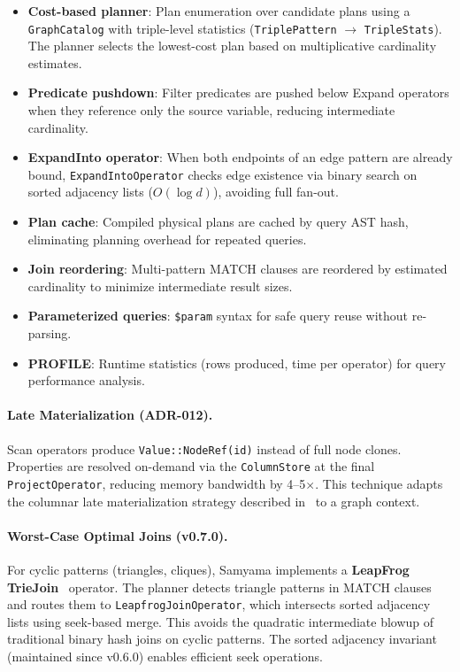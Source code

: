 \documentclass[11pt]{article}
\begin{document}
\begin{itemize}[leftmargin=*]
  \item \textbf{Cost-based planner}: Plan enumeration over candidate plans using a \texttt{GraphCatalog} with triple-level statistics (\texttt{TriplePattern} $\to$ \texttt{TripleStats}). The planner selects the lowest-cost plan based on multiplicative cardinality estimates.
  \item \textbf{Predicate pushdown}: Filter predicates are pushed below Expand operators when they reference only the source variable, reducing intermediate cardinality.
  \item \textbf{ExpandInto operator}: When both endpoints of an edge pattern are already bound, \texttt{ExpandIntoOperator} checks edge existence via binary search on sorted adjacency lists ($O(\log d)$), avoiding full fan-out.
  \item \textbf{Plan cache}: Compiled physical plans are cached by query AST hash, eliminating planning overhead for repeated queries.
  \item \textbf{Join reordering}: Multi-pattern MATCH clauses are reordered by estimated cardinality to minimize intermediate result sizes.
  \item \textbf{Parameterized queries}: \texttt{\$param} syntax for safe query reuse without re-parsing.
  \item \textbf{PROFILE}: Runtime statistics (rows produced, time per operator) for query performance analysis.
\end{itemize}

\paragraph{Late Materialization (ADR-012).}
Scan operators produce \texttt{Value::NodeRef(id)} instead of full node clones. Properties are resolved on-demand via the \texttt{ColumnStore} at the final \texttt{ProjectOperator}, reducing memory bandwidth by 4--5$\times$. This technique adapts the columnar late materialization strategy described in~\citet{abadi2008column} to a graph context.

\paragraph{Worst-Case Optimal Joins (v0.7.0).}
For cyclic patterns (triangles, cliques), Samyama implements a \textbf{LeapFrog TrieJoin}~\citep{veldhuizen2014triejoin} operator. The planner detects triangle patterns in MATCH clauses and routes them to \texttt{LeapfrogJoinOperator}, which intersects sorted adjacency lists using seek-based merge. This avoids the quadratic intermediate blowup of traditional binary hash joins on cyclic patterns. The sorted adjacency invariant (maintained since v0.6.0) enables efficient seek operations.
\end{document}
